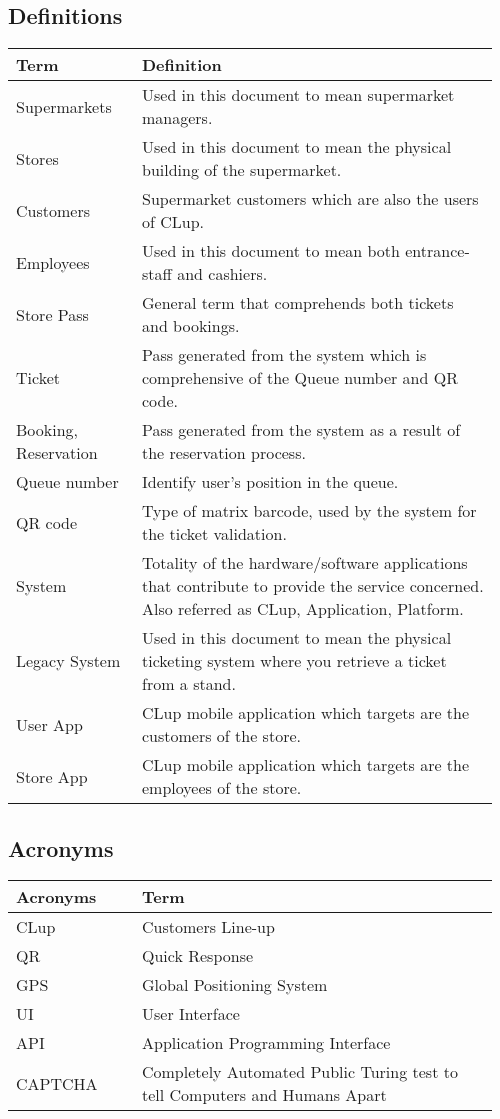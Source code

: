 \subsection{Definitions}
\begin{center}
	\begin{tabular}{@{}p{0.25\linewidth} p{0.71\linewidth}@{}}
		\toprule
		\textbf{Term} & \textbf{Definition}\\
		\midrule
		Supermarkets & Used in this document to mean supermarket managers.\\
		Stores & Used in this document to mean the physical building of the supermarket.\\
		Customers & Supermarket customers which are also the users of CLup.\\
		Employees & Used in this document to mean both entrance-staff and cashiers.\\
		Store Pass & General term that comprehends both tickets and bookings.\\
		Ticket & Pass generated from the system which is comprehensive of the Queue number and QR code.\\
		Booking, Reservation & Pass generated from the system as a result of the reservation process.\\
		Queue number & Identify user's position in the queue.\\
		QR code & Type of matrix barcode, used by the system for the ticket validation.\\
		System & Totality of the hardware/software applications that contribute to provide the service concerned. Also referred as CLup, Application, Platform.\\
		Legacy System & Used in this document to mean the physical ticketing system where you retrieve a ticket from a stand.\\
		User App & CLup mobile application which targets are the customers of the store.\\
		Store App & CLup mobile application which targets are the employees of the store.\\
		\bottomrule
	\end{tabular}
\end{center}

\subsection{Acronyms}
\begin{center}
	\begin{tabular}{@{}p{0.25\linewidth} p{0.71\linewidth}@{}}
		\toprule
		\textbf{Acronyms} & \textbf{Term}\\
		\midrule
		CLup & Customers Line-up\\
		QR & Quick Response\\
		GPS & Global Positioning System\\
		UI & User Interface\\
		API & Application Programming Interface\\
		CAPTCHA & Completely Automated Public Turing test to tell Computers and Humans Apart\\
		\bottomrule
	\end{tabular}
\end{center}

